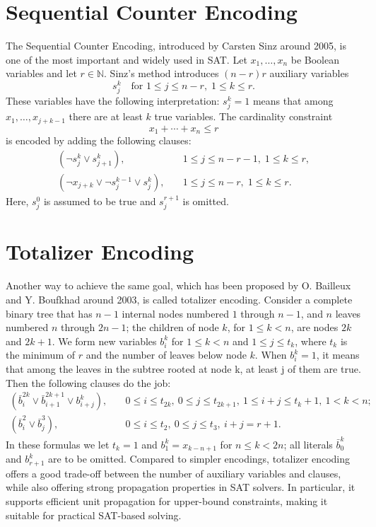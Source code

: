 \documentclass{report}
\begin{document}
\newpage
\section{Sequential Counter Encoding}
The Sequential Counter Encoding, introduced by Carsten Sinz around 2005, is one of the most important and widely used in SAT. \cite{sinz2005optimal}
Let $x_1, \dots, x_n$ be Boolean variables and let $r \in \mathbb{N}$. 
Sinz's method introduces \((n-r)r\) auxiliary variables
\[
s_j^k \quad \text{for } 1 \le j \le n-r,\; 1 \le k \le r.
\]
These variables have the following interpretation: \(s^k_j = 1\) means that among \(x_1, \dots, x_{j+k-1}\) there are at least \(k\) true variables.
The cardinality constraint
\[
x_1 + \cdots + x_n \le r
\]
is encoded by adding the following clauses:
\begin{align}
(\lnot s_j^k \lor s_{j+1}^k),
& \quad 1 \le j \le n-r-1,\; 1 \le k \le r, \label{eq:seq1} \\[4pt]
(\lnot x_{j+k} \lor \lnot s_j^{k-1} \lor s_j^k),
& \quad 1 \le j \le n-r,\; 1 \le k \le r. \label{eq:seq2}
\end{align}
Here, $s_j^0$ is assumed to be true and $s_j^{r+1}$ is omitted.

\setlength{\parskip}{1em}


\section{Totalizer Encoding}
Another way to achieve the same goal, which has been proposed by O. Bailleux and Y. Boufkhad around 2003, is called totalizer encoding. \cite{bailleux2003efficient}
Consider a complete binary tree that has $n-1$ internal nodes numbered $1$ through $n-1$, and $n$ leaves numbered $n$ through $2n-1$;
the children of node $k$, for $1 \le k < n$, are nodes $2k$ and $2k+1$.
We form new variables $b_i^k$ for $1 \le k < n$ and $1 \le j \le t_k$, where $t_k$ is the minimum of $r$ and the number of leaves below node $k$.
When \(b_i^k = 1\), it means that among the leaves in the subtree rooted at node k, at least j of them are true.
Then the following clauses do the job:
\begin{align}
(\bar{b}_i^{2k} \vee \bar{b}_{i+1}^{2k+1} \vee b_{i+j}^{k}), 
& \quad 0 \le i \le t_{2k},\ 0 \le j \le t_{2k+1},\ 1 \le i+j \le t_k+1,\ 1 < k < n; \label{eq:20} \\
(\bar{b}_i^2 \vee \bar{b}_j^3), 
& \quad 0 \le i \le t_2,\ 0 \le j \le t_3,\ i+j = r+1. \label{eq:21}
\end{align}
In these formulas we let $t_k = 1$ and $b_1^k = x_{k-n+1}$ for $n \le k < 2n$; all literals $\bar{b}_0^k$ and $b_{r+1}^k$ are to be omitted. Compared to simpler encodings, totalizer encoding offers a good trade-off between the number of auxiliary variables and clauses, while also offering strong propagation properties in SAT solvers. In particular, it supports efficient unit propagation for upper-bound constraints, making it suitable for practical SAT-based solving.
\end{document}
